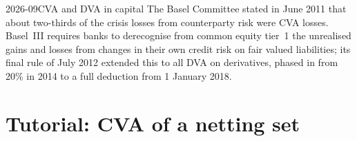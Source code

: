\begin{dated}{2026-09}{CVA and DVA in capital}\label{dat:rc:credit-and-debit-valuation-adjustments:dva}
The Basel Committee stated in June 2011 that about two-thirds of the crisis losses from
counterparty risk were CVA losses. Basel~III requires banks to derecognise from common
equity tier~1 the unrealised gains and losses from changes in their own credit risk on fair
valued liabilities; its final rule of July 2012 extended this to all DVA on derivatives,
phased in from 20\% in 2014 to a full deduction from 1 January 2018.
\end{dated}

\begin{omfigure}

\label{fig:rc:credit-and-debit-valuation-adjustments:dva}
\end{omfigure}

\section{Tutorial: CVA of a netting set}\label{tut:rc:credit-and-debit-valuation-adjustments:tutorial}


